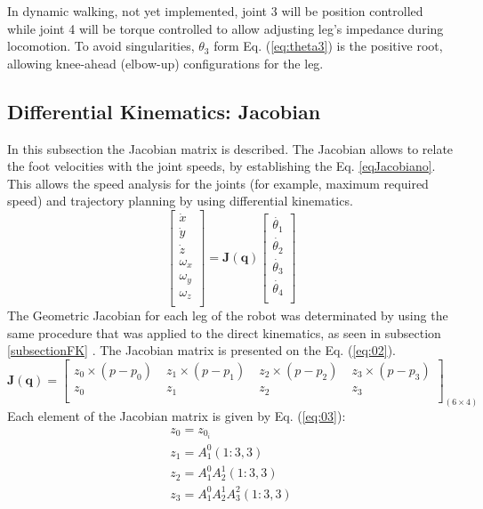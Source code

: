 In dynamic walking, not yet implemented, joint 3 will be position controlled while joint 4 will be torque controlled to allow adjusting leg's impedance during locomotion. To avoid singularities, $\theta_3$ form Eq. (\ref{eq:theta3}) is the positive root, allowing knee-ahead (elbow-up) configurations for the leg.
\subsection{Differential Kinematics: Jacobian}
In this subsection the Jacobian matrix is described. The Jacobian allows to relate the foot velocities with the joint speeds, by establishing the Eq. \ref{eqJacobiano}. This allows the speed analysis for the joints (for example, maximum required speed) and trajectory planning by using differential kinematics.
\begin{equation}
\label{eqJacobiano}
\left[
\begin{array}{c}
 \dot{x}\\
 \dot{y}\\
 \dot{z}\\
 \omega_x\\
 \omega_y\\
 \omega_z\\
\end{array}\right]
= \mathbf{J(q)}\left[
\begin{array}{c}
 \dot{\theta_1}\\
 \dot{\theta_2}\\
 \dot{\theta_3}\\
 \dot{\theta_4}\\
\end{array}\right]
\end{equation}
The Geometric Jacobian for each leg of the robot was determinated by using the same procedure that was applied to the direct kinematics, as seen in subsection \ref{subsectionFK} \cite{Sciavicco:2000}. The Jacobian matrix is presented on the Eq. (\ref{eq:02}).
\begin{equation} 
\label{eq:02}
\mathbf{J(q)} = \left[
\begin{array}{cccc}
z_0 \times (p-p_0)\; & z_1\times (p-p_1)\; & z_2\times (p-p_2)\;  & z_3\times (p-p_3) \\
z_0 & z_1 & z_2 & z_3 \\
\end{array}\right]_{(6\times 4)}
\end{equation}
Each element of the Jacobian matrix is given by Eq. (\ref{eq:03}):
\begin{equation} 
\label{eq:03}
\begin{array}{l}
z_0=z_{0_i}\\
z_1=A_1^0 (1:3,3)\\
z_2=A_1^0 A_2^1  (1:3,3)\\
z_3=A_1^0 A_2^1 A_3^2 (1:3,3)\\
\end{array}
\end{equation}
